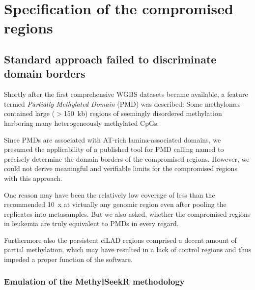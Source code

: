 \chapter{Specification of the compromised regions}
\label{chap:r:comprom:introduction} 
\setcounter{section}{2}
\section{Standard approach failed to discriminate domain borders}
\label{chap:r:comprom:methylseeker} 

Shortly after the first comprehensive WGBS datasets became available, a feature termed \emph{Partially Methylated Domain} (PMD) was described\cite{Lister2009}: Some methylomes contained large ($>$\SI{150}{\kilo b}) regions of seemingly disordered methylation harboring many heterogeneously methylated CpGs. 

Since PMDs are associated with AT-rich lamina-associated domains\cite{Schroeder2013,Gaidatzis2014}, we presumed the applicability of a published tool for PMD calling named \cite{Burger2013} to precisely determine the domain borders of the compromised regions. However, we could not derive meaningful and verifiable limits for the compromised regions with this approach.

One reason may have been the relatively low coverage of less than the recommended \SI{10}{x} at virtually any genomic region even after pooling the replicates into metasamples. But we also asked, whether the compromised regions in \dnmtchip leukemia are truly equivalent to PMDs in every regard. 

Furthermore also the persistent ciLAD regions comprised a decent amount of partial methylation, which may have resulted in a lack of control regions and thus impeded a proper function of the  software.

\subsection{Emulation of the MethylSeekR methodology}
\label{chap:r:comprom:methylseeker:emulation} 
 
